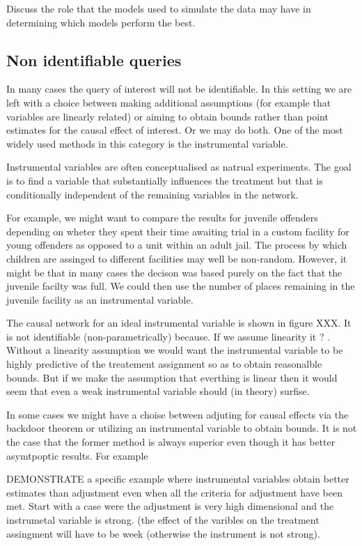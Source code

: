 \documentclass[11pt,a4paper,oneside]{book}
\begin{document}
Discuss the role that the models used to simulate the data may have in determining which models perform the best. 

\subsection*{Non identifiable queries}
In many cases the query of interest will not be identifiable. In this setting we are left with a choice between making additional assumptions (for example that variables are linearly related) or aiming to obtain bounds rather than point estimates for the causal effect of interest. Or we may do both. One of the most widely used methods in this category is the instrumental variable. 

Instrumental variables are often conceptualised as natrual experiments. The goal is to find a variable that substantially influences the treatment but that is conditionally independent of the remaining variables in the network. 

For example, we might want to compare the results for juvenile offenders depending on wheter they spent their time awaiting trial in a custom facility for young offenders as opposed to a unit within an adult jail. The process by which children are assinged to different facilities may well be non-random. However, it might be that in many cases the decison was based purely on the fact that the juvenile facilty was full. We could then use the number of places remaining in the juvenile facility as an instrumental variable. 

The causal network for an ideal instrumental variable is shown in figure XXX. It is not identifiable (non-parametrically) because. If we assume linearity it ? . Without a linearity assumption we would want the instrumental variable to be highly predictive of the treatement assignment so as to obtain reasonalble bounds. But if we make the assumption that everthing is linear then it would seem that even a weak instrumental variable should (in theory) surfise. 

In some cases we might have a choise between adjuting for causal effects via the backdoor theorem or utilizing an instrumental variable to obtain bounds. It is not the case that the former method is always superior even though it has better asymtpoptic results. For example 

DEMONSTRATE a specific example where instrumental variables obtain better estimates than adjustment even when all the criteria for adjustment have been met. Start with a case were the adjustment is very high dimensional and the instrumetal variable is strong. (the effect of the varibles on the treatment assingment will have to be week (otherwise the instrument is not strong). 
\end{document}
